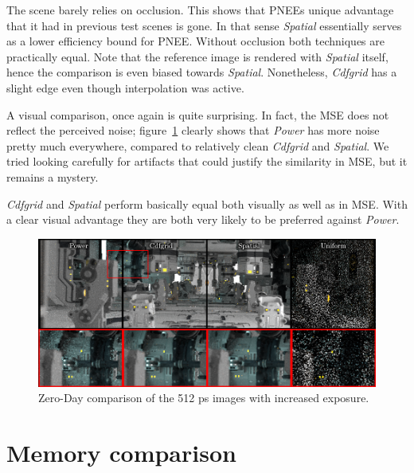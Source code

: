The scene barely relies on occlusion. This shows that PNEEs unique advantage that it had in previous test scenes is gone. In that sense \textit{Spatial} essentially serves as a lower efficiency bound for PNEE. Without occlusion both techniques are practically equal. Note that the reference image is rendered with \textit{Spatial} itself, hence the comparison is even biased towards \textit{Spatial}. Nonetheless, \textit{Cdfgrid} has a slight edge even though interpolation was active. 

A visual comparison, once again is quite surprising. In fact, the MSE does not reflect the perceived noise; figure~\ref{fig:zdcomp} clearly shows that \textit{Power} has more noise pretty much everywhere, compared to relatively clean \textit{Cdfgrid} and \textit{Spatial}. We tried looking carefully for artifacts that could justify the similarity in MSE, but it remains a mystery.

\textit{Cdfgrid} and \textit{Spatial} perform basically equal both visually as well as in MSE. With a clear visual advantage they are both very likely to be preferred against \textit{Power}.

\begin{figure}
    \centering
    \includegraphics[width=1\textwidth]{figures/comparisons/ZDcomp_slim.png}
    \caption{Zero-Day comparison of the 512 ps images with increased exposure. }
    \label{fig:zdcomp}
\end{figure}


\FloatBarrier
\section{Memory comparison}

